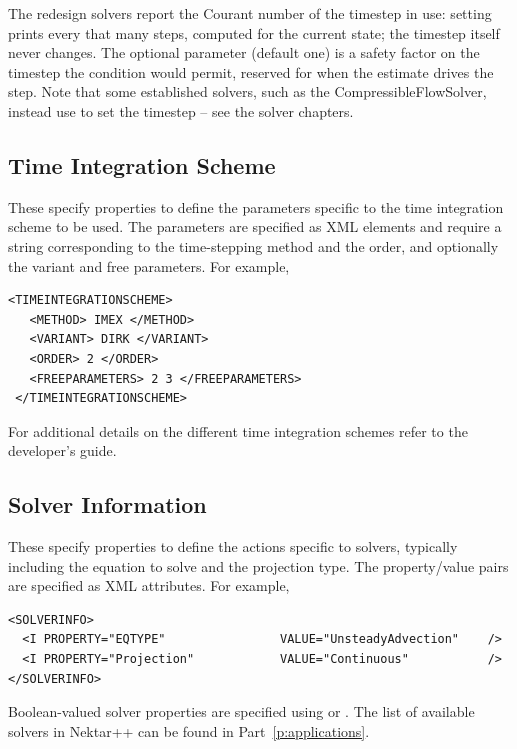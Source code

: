 The redesign solvers report the Courant number of the timestep in use:
setting  prints  every that many
steps, computed for the current state; the timestep itself never
changes. The optional  parameter (default one) is a safety
factor on the timestep the condition would permit, reserved for when
the estimate drives the step. Note that some established solvers, such
as the CompressibleFlowSolver, instead use  to set the
timestep -- see the solver chapters.

\subsection{Time Integration Scheme}

These specify properties to define the parameters specific to the time
integration scheme to be used. The parameters are specified as XML
elements and require a string corresponding to the time-stepping method
and the order, and optionally the variant and free parameters. For
example,

\begin{lstlisting}[style=XMLStyle]
 <TIMEINTEGRATIONSCHEME>
   <METHOD> IMEX </METHOD>
   <VARIANT> DIRK </VARIANT>
   <ORDER> 2 </ORDER>
   <FREEPARAMETERS> 2 3 </FREEPARAMETERS>
 </TIMEINTEGRATIONSCHEME>
\end{lstlisting}

For additional details on the different time integration schemes refer
to the developer's guide.

\subsection{Solver Information}

These specify properties to define the actions specific to solvers,
typically including the equation to solve and the projection type. The
property/value pairs are specified as XML attributes. For example,

\begin{lstlisting}[style=XMLStyle] 
<SOLVERINFO>
  <I PROPERTY="EQTYPE"                VALUE="UnsteadyAdvection"    /> 
  <I PROPERTY="Projection"            VALUE="Continuous"           /> 
</SOLVERINFO>
\end{lstlisting}

Boolean-valued solver properties are specified using  or . The list of available solvers in Nektar++ can be found in
Part~\ref{p:applications}.

